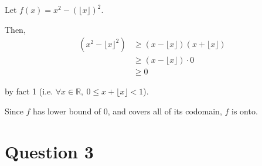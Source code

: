 \documentclass[12pt]{article}
\begin{document}
\begin{enumerate}[a.]
    Let $f(x) = x^2 - (\lfloor x \rfloor)^2$.

    \bigskip

    Then,
    \setcounter{equation}{0}
    \begin{align}
        (x^2 - \lfloor x \rfloor^2) &\geq (x - \lfloor x \rfloor)(x + \lfloor x \rfloor)\\
        &\geq (x - \lfloor x \rfloor) \cdot 0\\
        &\geq 0
    \end{align}

    by fact 1 (i.e. $\forall x \in \mathbb{R},\: 0 \leq x + \lfloor x \rfloor < 1$).

    \bigskip

    Since $f$ has lower bound of 0, and covers all of its codomain, $f$ is onto.

\end{enumerate}

\section*{Question 3}
\end{document}
